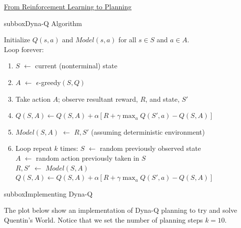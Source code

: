 \begin{textbox}{\href{https://compneuro.neuromatch.io/tutorials/W3D4_ReinforcementLearning/student/W3D4_Tutorial4.html}{From Reinforcement Learning to Planning } }

\begin{subbox}{subbox}{Dyna-Q Algorithm}
\scriptsize

Initialize $Q(s,a)$ and $Model(s,a)$ for all $s \in S$ and $a \in A$.\\
Loop forever:\\
\begin{enumerate}[label=(\alph*)]
    \item 
 $S$ $\leftarrow$ current (nonterminal) state 
 \item  $A$ $\leftarrow$ $\epsilon$-greedy$(S,Q)$ 
   \item  Take action $A$; observe resultant reward, $R$, and state, $S'$ 
   \item  $Q(S,A)\leftarrow Q(S,A) + \alpha \left[R + \gamma \max_{a} Q(S',a) - Q(S,A)\right]$ 
   \item  $Model(S,A)$ $\leftarrow$ $R,S'$ (assuming deterministic environment) 
   \item  Loop repeat $k$ times: 
 $S$ $\leftarrow$ random previously observed state \\
 $A$ $\leftarrow$ random action previously taken in $S$ \\
 $R,S'$ $\leftarrow$ $Model(S,A)$ \\
 $Q(S,A) \leftarrow Q(S,A) + \alpha \left[R + \gamma \max_{a} Q(S',a) - Q(S,A)\right]$ 
\end{enumerate}

\end{subbox}

\begin{subbox}{subbox}{Implementing Dyna-Q}
\scriptsize

The plot below show an implementation of Dyna-Q  planning to try and solve Quentin's World. Notice that we set the number of planning steps $k=10$.
\begin{center}
    

\end{center}
\end{subbox}
\end{textbox}
